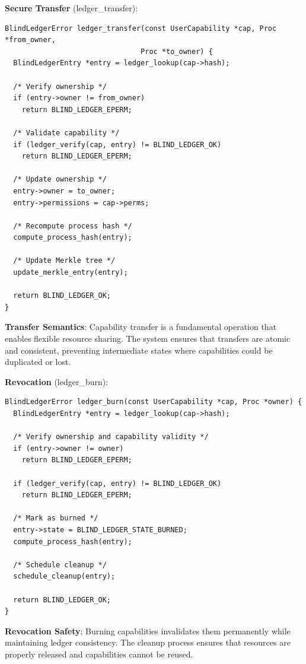 \documentclass[11pt,letterpaper]{article}
\begin{document}
\textbf{Secure Transfer} (ledger\_transfer):

\begin{lstlisting}
BlindLedgerError ledger_transfer(const UserCapability *cap, Proc *from_owner,
                                Proc *to_owner) {
  BlindLedgerEntry *entry = ledger_lookup(cap->hash);
  
  /* Verify ownership */
  if (entry->owner != from_owner)
    return BLIND_LEDGER_EPERM;
    
  /* Validate capability */
  if (ledger_verify(cap, entry) != BLIND_LEDGER_OK)
    return BLIND_LEDGER_EPERM;
    
  /* Update ownership */
  entry->owner = to_owner;
  entry->permissions = cap->perms;
  
  /* Recompute process hash */
  compute_process_hash(entry);
  
  /* Update Merkle tree */
  update_merkle_entry(entry);
  
  return BLIND_LEDGER_OK;
}
\end{lstlisting}

\textbf{Transfer Semantics}: Capability transfer is a fundamental operation that enables flexible resource sharing. The system ensures that transfers are atomic and consistent, preventing intermediate states where capabilities could be duplicated or lost.

\textbf{Revocation} (ledger\_burn):

\begin{lstlisting}
BlindLedgerError ledger_burn(const UserCapability *cap, Proc *owner) {
  BlindLedgerEntry *entry = ledger_lookup(cap->hash);
  
  /* Verify ownership and capability validity */
  if (entry->owner != owner)
    return BLIND_LEDGER_EPERM;
    
  if (ledger_verify(cap, entry) != BLIND_LEDGER_OK)
    return BLIND_LEDGER_EPERM;
    
  /* Mark as burned */
  entry->state = BLIND_LEDGER_STATE_BURNED;
  compute_process_hash(entry);
  
  /* Schedule cleanup */
  schedule_cleanup(entry);
  
  return BLIND_LEDGER_OK;
}
\end{lstlisting}

\textbf{Revocation Safety}: Burning capabilities invalidates them permanently while maintaining ledger consistency. The cleanup process ensures that resources are properly released and capabilities cannot be reused.
\end{document}
